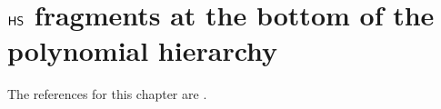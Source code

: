 \chapter{$\text{\sffamily HS}$ fragments at the bottom of the polynomial hierarchy}\label{chap:IC17}
\begin{chapref}
The references for this chapter are \cite{BOZZELLI2018IC,gandalf16,kr16}.
\end{chapref}

\minitoc\mtcskip

\newcommand{\mods}{\mathsf{ModSubf}_\AAbar}

\newcommand{\TBSAT}{TB(SAT)}
\newcommand{\TBSATM}{TB(SAT)$_{1\times M}$}
\newcommand{\forw}{\textsc{forward}}
\newcommand{\back}{\textsc{backward}}











%


